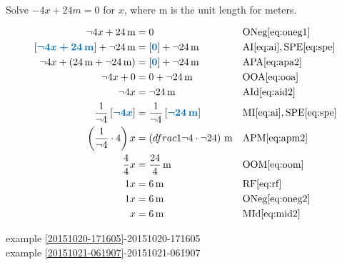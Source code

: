 \documentclass[20150903-160354-rs2.2-MarksMathNotebook.tex]{subfiles}
\begin{document}
\begin{example}[id:20151021-060347] \label{20151021-060347} \hfill \\
Solve $-4x + 24 \unit{m} = 0$ for $x$, where m is the unit length for meters.

\soln

\solnsteps
\begin{align*}
\neg 4x + 24 \unit{m} &= 0 && \text{ONeg} \eqref{eq:oneg1} \\
\farg{\neg 4x + 24 \unit{m}} + \neg 24 \unit{m} &= \farg{0} + \neg 24 \unit{m} && \text{AI} \eqref{eq:ai},\text{SPE} \eqref{eq:spe}  \\
\neg 4x + (24 \unit {m} + \neg 24 \unit{m}) &= \farg{0} + \neg 24 \unit{m} && \text{APA} \eqref{eq:apa2} \\
\neg 4x + 0 &=  0 + \neg 24 \unit{m} && \text{OOA} \eqref{eq:ooa} \\
\neg 4x &= \neg 24 \unit{m} && \text{AId} \eqref{eq:aid2} \\
\dfrac{1}{\neg 4} \farg{\neg 4x} &= \dfrac{1}{\neg 4} \farg{\neg 24 \unit{m}}  && \text{MI} \eqref{eq:ai},\text{SPE} \eqref{eq:spe}  \\
\left(\dfrac{1}{\neg 4} \cdot 4\right)x &= \left(dfrac{1}{\neg 4} \cdot \neg 24\right) \unit{m} && \text{APM} \eqref{eq:apm2} \\
\dfrac{4}{4}x &=\dfrac{24}{4} \unit{m} && \text{OOM} \eqref{eq:oom} \\
1x &= 6 \unit{m} && \text{RF} \eqref{eq:rf} \\
1x &= 6 \unit{m} && \text{ONeg} \eqref{eq:oneg2} \\
x &= 6 \unit{m} && \text{MId} \eqref{eq:mid2} 
\end{align*}

\qdepend

\qdependlist
example \ref{20151020-171605}-20151020-171605 \\

example \ref{20151021-061907}-20151021-061907


\end{example}
\end{document}
